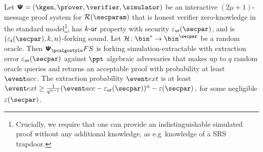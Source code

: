 \documentclass[runningheads,11pt]{llncs}
\begin{document}
\begin{theorem}
  \label{thm:se}
  Let $\ps = (\kgen, \prover, \verifier, \simulator)$ be an interactive
  $(2 \mu + 1)$-message proof system for $\RELGEN(\secparam)$ that is honest
  verifier zero-knowledge in the standard model\footnote{Crucially, we require
    that one can provide an indistinguishable simulated proof without any
    additional knowledge, as e.g~knowledge of a SRS trapdoor.}, has ${k\text{-}\mathsf{ur}}$
  property with security $\epsur(\secpar)$, and is $(\epss(\secpar), k, n)$-forking sound.
%
Let $\ro\colon \bin^{*} \to \bin^{\secpar}$ be a random oracle. 
Then $\psfs$ is forking simulation-extractable with extraction error $\epsur(\secpar)$
against $\ppt$ algebraic adversaries that makes up to $q$ random oracle queries and
returns an acceptable proof with probability at least $\accProb$. 
The extraction probability $\extProb$ is at least
\(
	\extProb \geq \frac{1}{q^{n - 1}} (\accProb - \epsur(\secpar))^{n} -\eps(\secpar)\,,
\)
for some negligible $\eps(\secpar)$.	
\end{theorem}
\end{document}
